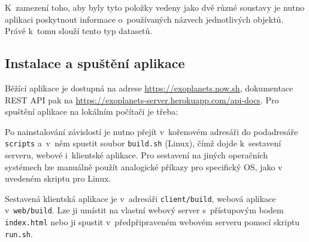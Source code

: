 \documentclass[a4paper,12pt]{article}
\def\code#1{\texttt{#1}}
\begin{document}
{{{{{{{{{K~zamezení toho, aby byly tyto položky vedeny jako dvě různé soustavy je nutno aplikaci poskytnout informace o~používaných názvech jednotlivých objektů. Právě k~tomu slouží tento typ datasetů.

\subsection{Instalace a spuštění aplikace}

Běžící aplikace je dostupná na adrese \url{https://exoplanets.now.sh}, dokumentace REST API pak na \url{https://exoplanets-server.herokuapp.com/api-docs}. Pro spuštění aplikace na lokálním počítači je třeba:

{

Po nainstalování závislostí je nutno přejít v~kořenovém adresáři do podadresáře \code{scripts} a~v~něm spustit soubor \code{build.sh} (Linux), čímž dojde k~sestavení serveru, webové i~klientské aplikace. Pro sestavení na jiných operačních systémech lze manuálně použít analogické příkazy pro specifický OS, jako v uvedeném skriptu pro Linux.



Sestavená klientská aplikace je v~adresáři \code{client/build}, webová aplikace v~\code{web/build}. Lze ji umístit na  vlastní webový server s~přístupovým bodem \code{index.html} nebo ji spustit v~předpřipraveném webovém serveru pomocí skriptu \code{run.sh}.

{

}}}}}}}}}}}
\end{document}
